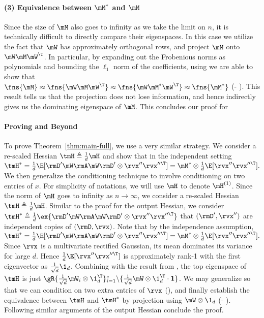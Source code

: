 \paragraph{(3) Equivalence between $\mM^*$ and $\mM$} Since the size of $\mM$ also goes to infinity as we take the limit on $n$, it is technically difficult to directly compare their eigenspaces. In this case we utilize the fact that $\mW$ has approximately orthogonal rows, and project $\mM$ onto $\mW\mM\mW^\T$. In particular, by expanding out the Frobenious norms as polynomials and bounding the $\ell_1$ norm of the coefficients, using  we are able to show that $\fns{\mM}\approx\fns{\mW\mM\mW^\T}\approx \fns{\mW\mM^*\mW^\T}\approx \fns{\mM^*}$ (- ).
This result tells us that the projection does not lose information, and hence indirectly gives us the dominating eigenspace of $\mM$. This concludes our proof for 

\paragraph{Proving  and Beyond}
To prove Theorem~\ref{thm:main-full}, we use a very similar strategy. We consider a re-scaled Hessian $\tmH\triangleq\frac1d\mH$ and show that in the independent setting $\tmH^* = \frac1d\E[\rmD'\mW\rmA\mW\rmD'\otimes \rvx''\rvx''^\T] = \mM^*\otimes\frac1d \E[\rvx''\rvx''^\T].$ We then generalize the conditioning technique to involve conditioning on two entries of $x$. 
\iffalse For simplicity of notations, we will use $\mH$ to denote $\mH^{(1)}$. Since the norm of $\mH$ goes to infinity as $n\to\infty$, we consider a re-scaled Hessian $\tmH\triangleq\frac1d\mH$. Similar to the proof for the output Hessian, we consider $\tmH^*\triangleq\frac1d\ex{\rmD'\mW\rmA\mW\rmD'\otimes \rvx''\rvx''^\T}$ that $(\rmD', \rvx'')$ are independent copies of $(\rmD, \rvx)$. Note that by the independence assumption, $\tmH^* = \frac1d\E[\rmD'\mW\rmA\mW\rmD'\otimes \rvx''\rvx''^\T] = \mM^*\otimes\frac1d \E[\rvx''\rvx''^\T].$
Since $\rvx$ is a multivariate rectified Gaussian, its mean dominates its variance for large $d$. Hence $\frac1d \E[\rvx''\rvx''^\T]$ is approximately rank-1 with the first eigenvector as $\frac{1}{\sqrt{d}}\1_d$. Combining with the result from , the top eigenspace of $\tmH$ is just $\gR\{\frac{1}{\sqrt{d}}\mW_i\otimes\1_d^\T\}_{i=1}^c\backslash\{\frac{1}{\sqrt{d}}\mW\otimes\1_d^\T\cdot\textbf{1}\}$.
We may generalize  so that we can condition on two extra entries of $\rvx$ (), and finally establish the equivalence between $\tmH$ and $\tmH^*$ by projection using $\mW\otimes\1_d$ (- ). Following similar arguments of the output Hessian conclude the proof.

